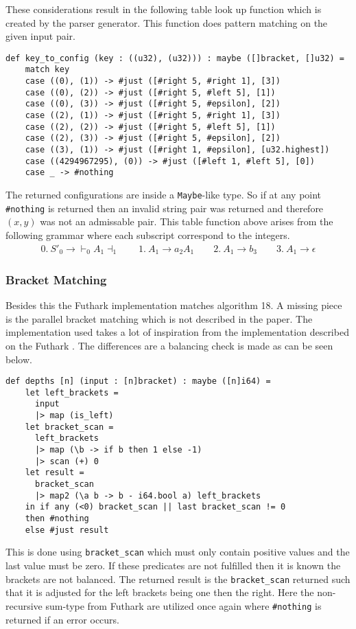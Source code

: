 These considerations result in the following table look up function which is created by the parser generator. This function does pattern matching on the given input pair.

\begin{lstlisting}[basicstyle=\ttfamily\scriptsize]
def key_to_config (key : ((u32), (u32))) : maybe ([]bracket, []u32) =
    match key
    case ((0), (1)) -> #just ([#right 5, #right 1], [3])
    case ((0), (2)) -> #just ([#right 5, #left 5], [1])
    case ((0), (3)) -> #just ([#right 5, #epsilon], [2])
    case ((2), (1)) -> #just ([#right 5, #right 1], [3])
    case ((2), (2)) -> #just ([#right 5, #left 5], [1])
    case ((2), (3)) -> #just ([#right 5, #epsilon], [2])
    case ((3), (1)) -> #just ([#right 1, #epsilon], [u32.highest])
    case ((4294967295), (0)) -> #just ([#left 1, #left 5], [0])
    case _ -> #nothing
\end{lstlisting}
The returned configurations are inside a \lstinline|Maybe|-like type. So if at any point \lstinline|#nothing| is returned then an invalid string pair was returned and therefore $(x,y)$ was not an admissable pair. This table function above arises from the following grammar where each subscript correspond to the integers.
\begin{align*}
    0. \: S'_0 \to \vdash_0 A_1 \dashv_1 \qquad 1. \: A_1 \to a_2 A_1 \qquad 2. \: A_1 \to b_3 \qquad 3. \: A_1 \to \epsilon
\end{align*}

\subsubsection{Bracket Matching}
Besides this the Futhark implementation matches algorithm 18. A missing piece is the parallel bracket matching which is not described in the paper. The implementation used takes a lot of inspiration from the implementation described on the Futhark \cite{futhark:parens}. The differences are a balancing check is made as can be seen below.
\begin{lstlisting}[basicstyle=\ttfamily\scriptsize]
def depths [n] (input : [n]bracket) : maybe ([n]i64) =
    let left_brackets =
      input
      |> map (is_left)
    let bracket_scan =
      left_brackets
      |> map (\b -> if b then 1 else -1)
      |> scan (+) 0
    let result =
      bracket_scan
      |> map2 (\a b -> b - i64.bool a) left_brackets
    in if any (<0) bracket_scan || last bracket_scan != 0
    then #nothing
    else #just result
\end{lstlisting}
This is done using \lstinline|bracket_scan| which must only contain positive values and the last value must be zero. If these predicates are not fulfilled then it is known the brackets are not balanced. The returned result is the \lstinline|bracket_scan| returned such that it is adjusted for the left brackets being one then the right. Here the non-recursive sum-type from Futhark are utilized once again where \lstinline|#nothing| is returned if an error occurs.

